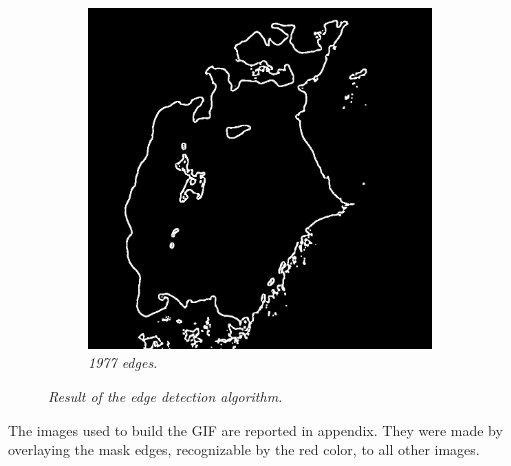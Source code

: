 \begin{figure}[H]
\begin{subfigure}[b]{.45\textwidth}
        \includegraphics[width=\textwidth]{../img/1977_edge_red.jpg}
        \caption{\emph{1977 edges.}}
    \end{subfigure}
    \caption{\emph{Result of the edge detection algorithm.}}
    \label{fig:edges}
\end{figure}
The images used to build the GIF are reported in appendix. They were made by overlaying the mask edges, recognizable by the red color, to all other images.

